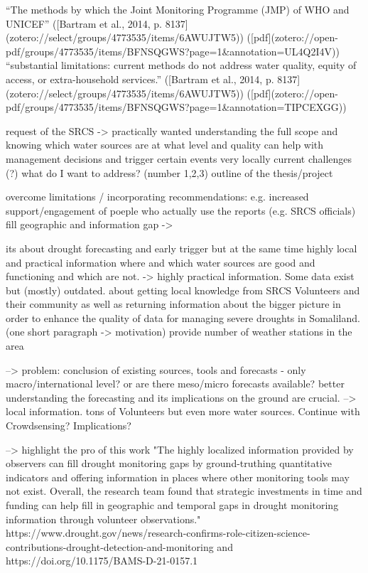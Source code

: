 “The methods by which the Joint Monitoring Programme (JMP) of WHO and UNICEF” ([Bartram et al., 2014, p. 8137](zotero://select/groups/4773535/items/6AWUJTW5)) ([pdf](zotero://open-pdf/groups/4773535/items/BFNSQGWS?page=1&annotation=UL4Q2I4V))
“substantial limitations: current methods do not address water quality, equity of access, or extra-household services.” ([Bartram et al., 2014, p. 8137](zotero://select/groups/4773535/items/6AWUJTW5)) ([pdf](zotero://open-pdf/groups/4773535/items/BFNSQGWS?page=1&annotation=TIPCEXGG))

request of the SRCS -> practically wanted
understanding the full scope and knowing which water sources are at what level and quality can help with management decisions and trigger certain events very locally
current challenges (?) what do I want to address? (number 1,2,3)
outline of the thesis/project

overcome limitations / incorporating recommendations: e.g. increased support/engagement of poeple who actually use the reports (e.g. SRCS officials) 
fill geographic and information gap ->

its about drought forecasting and early trigger but at the same time highly local and practical information where and which water sources are good and functioning and which are not. -> highly practical information. Some data exist but (mostly) outdated.
about getting local knowledge from SRCS Volunteers and their community as well as returning information about the bigger picture
in order to enhance the quality of data for managing severe droughts in Somaliland. (one short paragraph -> motivation)
provide number of weather stations in the area

--> problem: conclusion of existing sources, tools and forecasts - only macro/international level? or are there meso/micro forecasts available?
better understanding the forecasting and its implications on the ground are crucial. --> local information. tons of Volunteers but even more water sources. Continue with Crowdsensing? Implications?

--> highlight the pro of this work
"The highly localized information provided by observers can fill drought monitoring gaps by ground-truthing quantitative indicators and offering information in places where other monitoring tools may not exist. Overall, the research team found that strategic investments in time and funding can help fill in geographic and temporal gaps in drought monitoring information through volunteer observations."
https://www.drought.gov/news/research-confirms-role-citizen-science-contributions-drought-detection-and-monitoring and https://doi.org/10.1175/BAMS-D-21-0157.1

